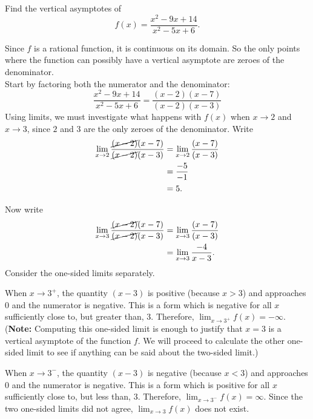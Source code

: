 \documentclass{ximera}
\begin{document}
\begin{example}
	Find the vertical asymptotes of 
	\[ f(x) = \frac{x^2-9x+14}{x^2-5x+6}. \]

\begin{explanation}
Since $f$ is a rational function, it is continuous on its domain. So the only points where the function can possibly have a vertical asymptote are zeroes of the denominator. \\
Start by factoring both the numerator and the denominator:
\[
\frac{x^2-9x+14}{x^2-5x+6} = \frac{(x-2)(x-7)}{(x-2)(x-3)}
\]
Using limits, we must investigate what happens with $ f(x)$ when $x\to 2$ and $x\to 3$, since $2$ and $3$ are the only zeroes of the denominator. Write
\begin{align*}
	\lim_{x\to 2} \frac{\cancel{(x-2)}(x-7)}{\cancel{(x-2)}(x-3)} &= \lim_{x\to 2} \frac{(x-7)}{(x-3)}\\
		&= \frac{-5}{-1}\\
		&=5.
\end{align*}

Now write
\begin{align*}
	\lim_{x\to 3} \frac{\cancel{(x-2)}(x-7)}{\cancel{(x-2)}(x-3)} &= \lim_{x\to 3} \frac{(x-7)}{(x-3)}\\
		&= \lim_{x\to 3}\frac{-4}{x-3}.
\end{align*}
Consider the one-sided limits separately. 

When $x\to 3^+$, the quantity $(x-3)$ is positive (because $x>3$) and approaches $0$ and the numerator is negative. This is a \numOverZero form which is negative for all $x$ sufficiently close to, but greater than, $3$. Therefore, $\displaystyle \lim_{x\to 3^+} f(x) = -\infty$.
(\textbf{Note:} Computing this one-sided limit is enough to justify that $x=3$ is a vertical asymptote of the function $f$. We will proceed to calculate the other one-sided limit to see if anything can be said about the two-sided limit.)


When $x\to 3^-$, the quantity $(x-3)$ is negative (because $x<3$) and approaches $0$ and the numerator is negative. This is a \numOverZero form which is positive for all $x$ sufficiently close to, but less than, $3$. Therefore, $\displaystyle \lim_{x\to 3^-} f(x) = \infty$. Since the two one-sided limits did not agree, $\displaystyle \lim_{x\to 3}f(x)$ does not exist.


\end{explanation}
\end{example}
\end{document}
